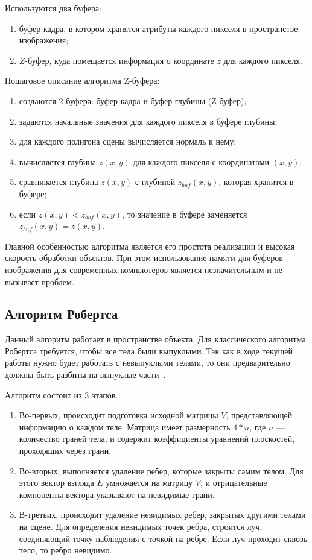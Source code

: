 Используются два буфера:
\begin{enumerate} [label=\arabic*)]
	\item буфер кадра, в котором хранятся атрибуты каждого пикселя в пространстве изображения;
	\item $Z$-буфер, куда помещается информация о координате $z$ для каждого пикселя.
\end{enumerate}

Пошаговое описание алгоритма Z-буфера:
\begin{enumerate} [label=\arabic*)]
	\item создаются 2 буфера: буфер кадра и буфер глубины (Z-буфер);
	\item задаются начальные значения для каждого пикселя в буфере глубины;
	\item для каждого полигона сцены вычисляется нормаль к нему;
	\item вычисляется глубина $z(x, y)$ для каждого пикселя с координатами $(x, y)$;
	\item сравнивается глубина $z(x, y)$ с глубиной $z_{buf}(x, y)$, которая хранится в буфере;
	\item если $z(x, y) < z_{buf}(x, y)$, то значение в буфере заменяется $z_{buf}(x, y) = z(x, y)$.
\end{enumerate}

Главной особенностью алгоритма является его простота реализации и высокая скорость обработки объектов. При этом использование памяти для буферов изображения для современных компьютеров является незначительным и не вызывает проблем.


\subsection{Алгоритм Робертса}


Данный алгоритм работает в пространстве объекта. Для классического алгоритма Робертса требуется, чтобы все тела были выпуклыми. Так как в ходе текущей работы нужно будет работать с невыпуклыми телами, то они предварительно должны быть разбиты на выпуклые части~\cite{roders}. 

Алгоритм состоит из 3 этапов.
\begin{enumerate} [label=\arabic*)]
	\item Во-первых, происходит подготовка исходной матрицы $V$, представляющей информацию о каждом теле. Матрица имеет размерность $4 * n$, где $n$ --- количество граней тела, и содержит коэффициенты уравнений плоскостей, проходящих через грани. 
	\item Во-вторых, выполняется удаление ребер, которые закрыты самим телом. Для этого вектор взгляда $E$ умножается на матрицу $V$, и отрицательные компоненты вектора указывают на невидимые грани.
	\item В-третьих, происходит удаление невидимых ребер, закрытых другими телами на сцене. Для определения невидимых точек ребра, строится луч, соединяющий точку наблюдения с точкой на ребре. Если луч проходит сквозь тело, то ребро невидимо.
\end{enumerate}

